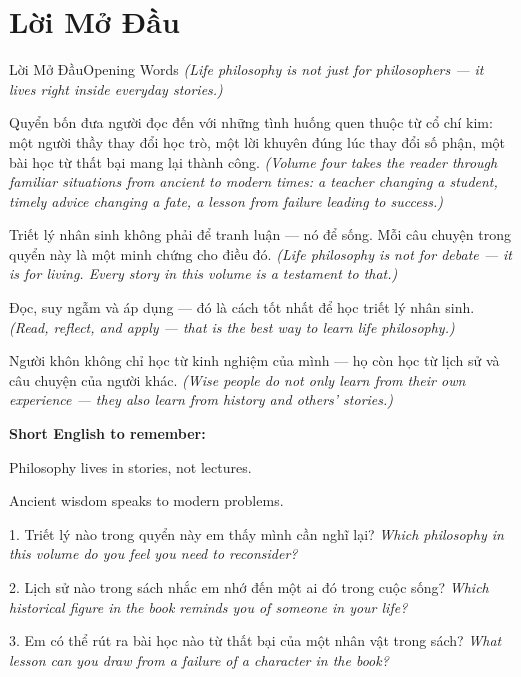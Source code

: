 \chapter*{Lời Mở Đầu}

\begin{truyen}{Lời Mở Đầu}{Opening Words}
\textit{(Life philosophy is not just for philosophers --- it lives right inside everyday stories.)}

Quyển bốn đưa người đọc đến với những tình huống quen thuộc từ cổ chí kim: một người thầy thay đổi học trò, một lời khuyên đúng lúc thay đổi số phận, một bài học từ thất bại mang lại thành công.
\textit{(Volume four takes the reader through familiar situations from ancient to modern times: a teacher changing a student, timely advice changing a fate, a lesson from failure leading to success.)}

Triết lý nhân sinh không phải để tranh luận — nó để sống. Mỗi câu chuyện trong quyển này là một minh chứng cho điều đó.
\textit{(Life philosophy is not for debate --- it is for living. Every story in this volume is a testament to that.)}

Đọc, suy ngẫm và áp dụng — đó là cách tốt nhất để học triết lý nhân sinh.
\textit{(Read, reflect, and apply --- that is the best way to learn life philosophy.)}
\end{truyen}

\begin{baihoc}
Người khôn không chỉ học từ kinh nghiệm của mình --- họ còn học từ lịch sử và câu chuyện của người khác.
\textit{(Wise people do not only learn from their own experience --- they also learn from history and others' stories.)}
\end{baihoc}

\begin{tcolorbox}[colback=truyenblue!6,colframe=truyenblue,coltitle=white,fonttitle=\bfseries,title={Easy English},arc=4pt,boxrule=1pt,breakable]
\textbf{Short English to remember:}

Philosophy lives in stories, not lectures.

Ancient wisdom speaks to modern problems.
\end{tcolorbox}

\begin{tcolorbox}[colback=truyengold!10,colframe=truyengold!70!black,coltitle=black,fonttitle=\bfseries,title={Tự Học Nhanh},arc=4pt,boxrule=1pt,breakable]
1. Triết lý nào trong quyển này em thấy mình cần nghĩ lại? \textit{Which philosophy in this volume do you feel you need to reconsider?}

2. Lịch sử nào trong sách nhắc em nhớ đến một ai đó trong cuộc sống? \textit{Which historical figure in the book reminds you of someone in your life?}

3. Em có thể rút ra bài học nào từ thất bại của một nhân vật trong sách? \textit{What lesson can you draw from a failure of a character in the book?}
\end{tcolorbox}

\ngancach

